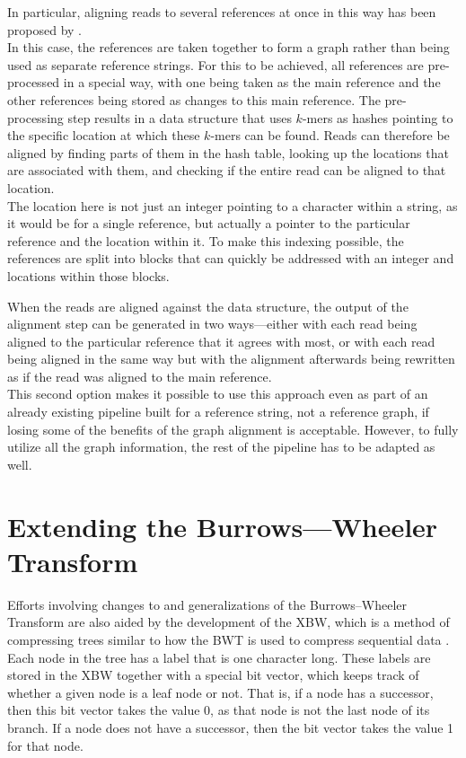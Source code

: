 \documentclass[a4paper,12pt,twoside,BCOR=10mm]{scrbook}
\begin{document}
In particular, aligning reads to several references at once 
in this way has been proposed by \citet{Schneeberger2009}. \\
In this case, the references are taken together to form a graph 
rather than being used as separate reference strings. 
For this to be achieved, all references are pre-processed in a special way, with one being taken as the 
main reference and the other references being stored as changes to this main reference. 
The pre-processing step results in a data structure that uses $ k $-mers as hashes pointing 
to the specific location at which these $ k $-mers can be found. Reads can therefore be aligned 
by finding parts of them in the hash table, looking up the locations that are associated with 
them, and checking if the entire read can be aligned to that location. \\
The location here is not just an integer pointing to a character within a string, 
as it would be for a single reference, but actually 
a pointer to the particular reference and the location within it. 
To make this indexing possible, the references are split into blocks that 
can quickly be addressed with an integer and locations within those blocks.

When the reads are aligned against the data structure, the output of the alignment step 
can be generated in two ways---either with each read being aligned to the particular reference 
that it agrees with most, or with each read being aligned in the same way but with the 
alignment afterwards being rewritten as if the read was aligned to the main reference. \\
This second option makes it possible to use this approach even as part of an already existing pipeline 
built for a reference string, not a reference graph, if losing some of the benefits of 
the graph alignment is acceptable. However, to fully utilize all the graph information, 
the rest of the pipeline has to be adapted as well.

\section{Extending the Burrows---Wheeler Transform}

Efforts involving changes to and generalizations of the Burrows--Wheeler Transform 
are also aided by the development of the XBW, which is a 
method of compressing trees similar to how the BWT is used to compress sequential data \citep{Ferragina2009}. \\
Each node in the tree has a label that is one character long. 
These labels are stored in the XBW together with a special bit vector, 
which keeps track of whether a given node is a leaf node or not. 
That is, if a node has a successor, then this bit vector takes the value 0, as that node is not the last node 
of its branch. If a node does not have a successor, then the bit vector takes the value 1 for that node. \\
\end{document}
